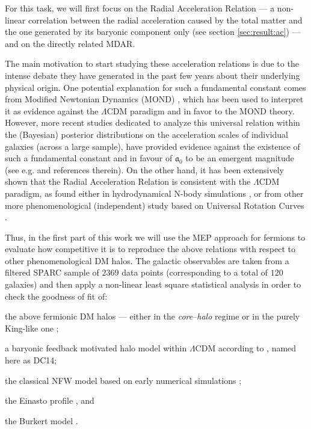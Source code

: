 For this task, we will first focus on the Radial Acceleration Relation --- a non-linear correlation between the radial acceleration caused by the total matter and the one generated by its baryonic component only (see section \ref{sec:result:ac}) --- and on the directly related MDAR.

The main motivation to start studying these acceleration relations is due to the intense debate they have generated in the past few years about their underlying physical origin.  One potential explanation for {such a fundamental constant} comes from Modified Newtonian Dynamics (MOND) \citep{2015CaJPh..93..169K,2016arXiv160906642M,2016PhRvL.117t1101M,2018A&A...615A...3L}, which has been used to interpret it as evidence against the $\Lambda$CDM paradigm and in favor to the MOND theory. However, more recent studies dedicated to analyze this universal relation within the (Bayesian) posterior distributions on the acceleration scales of individual galaxies (across a large sample), have provided evidence against the existence of such a fundamental constant and in favour of $\mathfrak{a}_0$ to be an emergent magnitude (see e.g. \citealp{2020MNRAS.494.2875M} and references therein). On the other hand, it has been extensively shown that the Radial Acceleration Relation is consistent with the $\Lambda$CDM paradigm, as found either in hydrodynamical N-body simulations  \citep{2016MNRAS.456L.127D,2017MNRAS.471.1841N,2017PhRvL.118p1103L,2019MNRAS.485.1886D}, or from other more phenomenological (independent) study based on Universal Rotation Curves \citep{2018FoPh...48.1517S}.

Thus, in the first part of this work we will use the MEP approach for fermions to evaluate how competitive it is to reproduce the above relations with respect to other phenomenological DM halos. The galactic observables are taken from a filtered SPARC sample of $2369$ data points (corresponding to a total of $120$ galaxies) and then apply a non-linear least square statistical analysis in order to check the goodness of fit of: 
%
\begin{inparaenum}[(a)]
    \item the above fermionic DM halos --- either in the \textit{core}--\textit{halo} regime \citep{2019PDU....24..278A,2021MNRAS.502.4227A} or in the purely King-like one \citep{2021MNRAS.502.4227A};
    \item a baryonic feedback motivated halo model within $\Lambda$CDM according to \citet{2014MNRAS.441.2986D}, named here as DC14;
    \item the classical NFW model based on early numerical simulations \citep{1997ApJ...490..493N};
    \item the Einasto profile \citep{1989A&A...223...89E,2006AJ....132.2685M}, and
    \item the Burkert model \citep{1995ApJ...447L..25B}.
\end{inparaenum}

